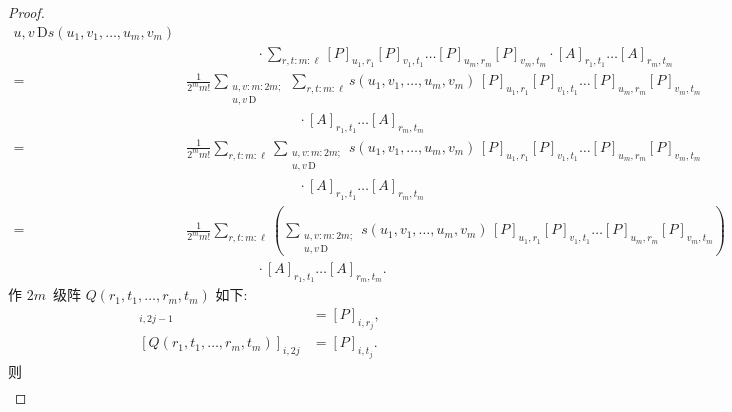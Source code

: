 \documentclass[../libro.tex]{subfiles}
\begin{document}
\begin{proof}
\begin{align*}
{{                u, v \,\text{D}
        }}
        s(u_1, v_1, \dots, u_m, v_m) \\
        &
        \quad \quad \quad \quad \quad
        {} \cdot
        \sum_{r, t \text{:}\, m \text{:}\, \ell}
        [P]_{u_1,r_1} [P]_{v_1,t_1} \dots [P]_{u_m,r_m} [P]_{v_m,t_m}
        \cdot [A]_{r_1,t_1} \dots [A]_{r_m,t_m}
        \\
        = {} &
        \frac{1}{2^m m!}
        \sum_{\substack{
                u, v \text{:}\, m \text{:}\, 2m; \\
                u, v \,\text{D}
        }}
        \sum_{r, t \text{:}\, m \text{:}\, \ell}
        s(u_1, v_1, \dots, u_m, v_m)
        \,
        [P]_{u_1,r_1} [P]_{v_1,t_1} \dots [P]_{u_m,r_m} [P]_{v_m,t_m}
        \\
        &
        \quad \quad \quad \quad
        \quad \quad \quad \quad
        {} \cdot [A]_{r_1,t_1} \dots [A]_{r_m,t_m}
        \\
        = {} &
        \frac{1}{2^m m!}
        \sum_{r, t \text{:}\, m \text{:}\, \ell}
        \sum_{\substack{
                u, v \text{:}\, m \text{:}\, 2m; \\
                u, v \,\text{D}
        }}
        s(u_1, v_1, \dots, u_m, v_m)
        \,
        [P]_{u_1,r_1} [P]_{v_1,t_1} \dots [P]_{u_m,r_m} [P]_{v_m,t_m}
        \\
        &
        \quad \quad \quad \quad
        \quad \quad \quad \quad
        {} \cdot [A]_{r_1,t_1} \dots [A]_{r_m,t_m}
        \\
        = {} &
        \frac{1}{2^m m!}
        \sum_{r, t \text{:}\, m \text{:}\, \ell}
        \left(
            \sum_{\substack{
                    u, v \text{:}\, m \text{:}\, 2m; \\
                    u, v \,\text{D}
            }}
            s(u_1, v_1, \dots, u_m, v_m)
            \,
            [P]_{u_1,r_1} [P]_{v_1,t_1} \dots [P]_{u_m,r_m} [P]_{v_m,t_m}
        \right)
        \\
        &
        \quad \quad \quad \quad \quad
        {} \cdot [A]_{r_1,t_1} \dots [A]_{r_m,t_m}.
    \end{align*}
    作 \(2m\)~级阵 \(Q(r_1, t_1, \dots, r_m, t_m)\) 如下:
    \begin{align*}
        [Q(r_1, t_1, \dots, r_m, t_m)]_{i,2j-1} & = [P]_{i,r_j}, \\
        [Q(r_1, t_1, \dots, r_m, t_m)]_{i,2j}   & = [P]_{i,t_j}.
    \end{align*}
    则
    \begin{align*}

\end{align*}
\end{proof}
\end{document}
